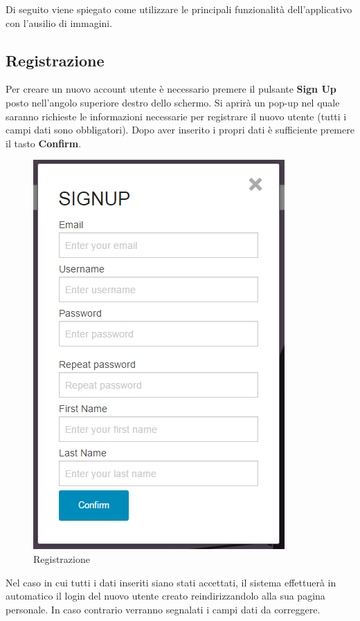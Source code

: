 Di seguito viene spiegato come utilizzare le principali funzionalità dell'applicativo con l'ausilio di immagini.


\subsection{Registrazione}
Per creare un nuovo account utente è necessario premere il pulsante \textbf{Sign Up} posto nell'angolo superiore destro dello schermo. Si aprirà un pop-up nel quale saranno richieste le informazioni necessarie per registrare il nuovo utente (tutti i campi dati sono obbligatori). Dopo aver inserito i propri dati è sufficiente premere il tasto \textbf{Confirm}.

\begin{figure}[h] 
	\centering 
	\includegraphics[scale=0.40] {img/signup.png}
	\caption{Registrazione} 
\end{figure}

\noindent Nel caso in cui tutti i dati inseriti siano stati accettati, il sistema effettuerà in automatico il login del nuovo utente creato reindirizzandolo alla sua pagina personale.
In caso contrario verranno segnalati i campi dati da correggere.

